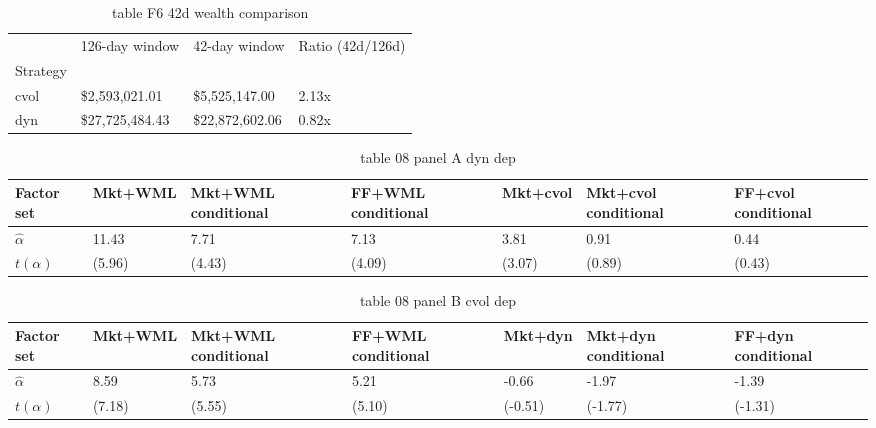 \documentclass{article}
\begin{document}
\begin{table}[htbp]
  \centering
  \caption{table F6 42d wealth comparison}
  \label{tab:table_F6_42d_wealth_comparison}
  \begin{tabular}{llll}
\toprule
 & 126-day window & 42-day window & Ratio (42d/126d) \\
Strategy &  &  &  \\
\midrule
cvol & \$2,593,021.01 & \$5,525,147.00 & 2.13x \\
dyn & \$27,725,484.43 & \$22,872,602.06 & 0.82x \\
\bottomrule
\end{tabular}
\end{table}

\begin{table}[htbp]
  \centering
  \caption{table 08 panel A dyn dep}
  \label{tab:table_08_panel_A_dyn_dep}
  \begin{tabular}{lllllll}
\toprule
Factor set & Mkt+WML & Mkt+WML conditional & FF+WML conditional & Mkt+cvol & Mkt+cvol conditional & FF+cvol conditional \\
\midrule
$\hat{\alpha}$ & 11.43 & 7.71 & 7.13 & 3.81 & 0.91 & 0.44 \\
$t(\alpha)$ & (5.96) & (4.43) & (4.09) & (3.07) & (0.89) & (0.43) \\
\bottomrule
\end{tabular}
\end{table}

\begin{table}[htbp]
  \centering
  \caption{table 08 panel B cvol dep}
  \label{tab:table_08_panel_B_cvol_dep}
  \begin{tabular}{lllllll}
\toprule
Factor set & Mkt+WML & Mkt+WML conditional & FF+WML conditional & Mkt+dyn & Mkt+dyn conditional & FF+dyn conditional \\
\midrule
$\hat{\alpha}$ & 8.59 & 5.73 & 5.21 & -0.66 & -1.97 & -1.39 \\
$t(\alpha)$ & (7.18) & (5.55) & (5.10) & (-0.51) & (-1.77) & (-1.31) \\
\bottomrule
\end{tabular}
\end{table}
\end{document}
